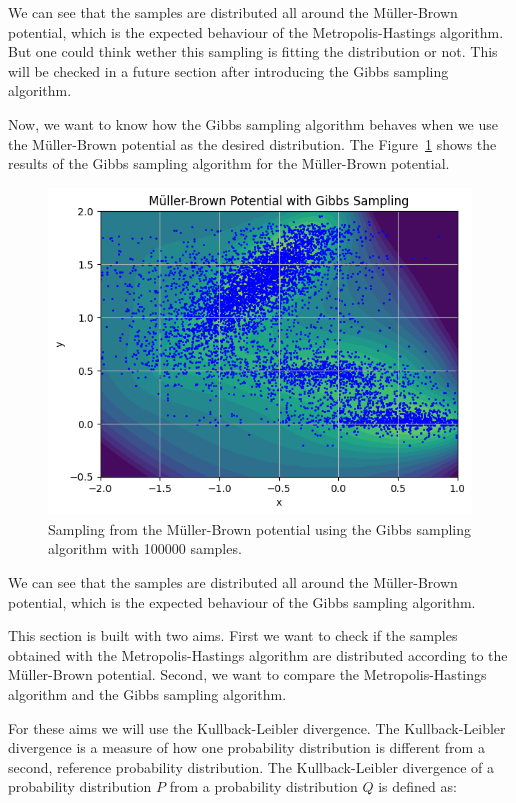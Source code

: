 \documentclass{article}
\begin{document}
We can see that the samples are distributed all around the Müller-Brown potential, which is the expected behaviour of the Metropolis-Hastings algorithm. But one could think wether this sampling is fitting the distribution or not. This will be checked in a future section after introducing the Gibbs sampling algorithm.



Now, we want to know how the Gibbs sampling algorithm behaves when we use the Müller-Brown potential as the desired distribution. The Figure~\ref{fig:mullerbrowngibbs} shows the results of the Gibbs sampling algorithm for the Müller-Brown potential.

\begin{figure}[H]
	\centering
	\includegraphics[width=0.5\linewidth]{./Figures/MCMC/mullerbrowngibbs.png}
	\caption{Sampling from the Müller-Brown potential using the Gibbs sampling algorithm with 100000 samples.}
	\label{fig:mullerbrowngibbs}
\end{figure}

We can see that the samples are distributed all around the Müller-Brown potential, which is the expected behaviour of the Gibbs sampling algorithm. 


This section is built with two aims. First we want to check if the samples obtained with the Metropolis-Hastings algorithm are distributed according to the Müller-Brown potential. Second, we want to compare the Metropolis-Hastings algorithm and the Gibbs sampling algorithm.

For these aims we will use the Kullback-Leibler divergence. The Kullback-Leibler divergence is a measure of how one probability distribution is different from a second, reference probability distribution. The Kullback-Leibler divergence of a probability distribution $P$ from a probability distribution $Q$ is defined as:
\end{document}
